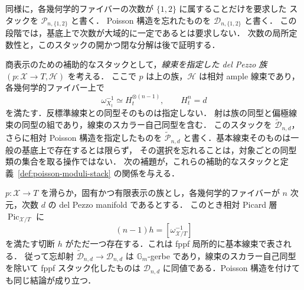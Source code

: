 同様に，各幾何学的ファイバーの次数が $\{1,2\}$ に属することだけを要求した
スタックを $\mathcal P_{n,\{1,2\}}$ と書く．
Poisson 構造を忘れたものを $\mathcal D_{n,\{1,2\}}$ と書く．
この段階では，基底上で次数が大域的に一定であるとは要求しない．
次数の局所定数性と，このスタックの開かつ閉な分解は後で証明する．

商表示のための補助的なスタックとして，\emph{線束を指定した del Pezzo 族}
$(p:\mathcal X\to T,\mathcal H)$ を考える．
ここで $p$ は上の族，$\mathcal H$ は相対 ample 線束であり，各幾何学的ファイバー上で
\[
 \omega_{X_t}^{-1}\simeq H_t^{\otimes(n-1)},\qquad H_t^n=d
\]
を満たす．反標準線束との同型そのものは指定しない．
射は族の同型と偏極線束の同型の組であり，線束のスカラー自己同型を含む．
このスタックを $\widetilde{\mathcal D}_{n,d}$，さらに相対 Poisson 構造を指定したものを
$\widetilde{\mathcal P}_{n,d}$ と書く．基本線束そのものは一般の基底上で存在するとは限らず，
その選択を忘れることは，対象ごとの同型類の集合を取る操作ではない．
次の補題が，これらの補助的なスタックと定義~\ref{def:poisson-moduli-stack} の関係を与える．

\begin{lemma}[基本偏極類の一意性と無標識の族]
\label{lemma:fundamental-polarization-class}
$p:\mathcal X\to T$ を滑らか，固有かつ有限表示の族とし，各幾何学的ファイバーが
$n$ 次元，次数 $d$ の del Pezzo manifold であるとする．
このとき相対 Picard 層 $\operatorname{Pic}_{\mathcal X/T}$ に
\[
 (n-1)h=[\omega_{\mathcal X/T}^{-1}]
\]
を満たす切断 $h$ がただ一つ存在する．これは fppf 局所的に基本線束で表される．
従って忘却射 $\widetilde{\mathcal D}_{n,d}\to\mathcal D_{n,d}$ は
$\mathbb G_m$-gerbe であり，線束のスカラー自己同型を除いて fppf スタック化したものは
$\mathcal D_{n,d}$ に同値である．Poisson 構造を付けても同じ結論が成り立つ．
\end{lemma}

